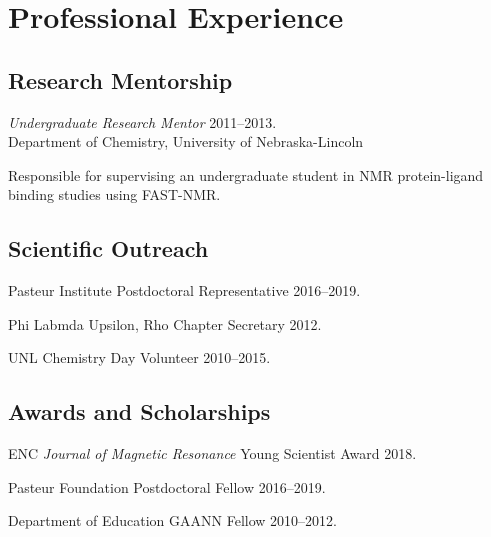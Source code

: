 \documentclass[letterpaper]{article}
\renewenvironment{itemize}{
  \begin{list}{}{
    \setlength{\leftmargin}{1.5em}
  }
}{
  \end{list}
}
\begin{document}
\section*{Professional Experience}

\subsection*{Research Mentorship}

\begin{itemize}
\item{
  {\it Undergraduate Research Mentor}
  \hfill 2011--2013. \\
  Department of Chemistry, University of Nebraska-Lincoln
  \begin{enumerate*}
    \item Responsible for supervising an undergraduate student in NMR
      protein-ligand binding studies using FAST-NMR.
  \end{enumerate*}
}
\end{itemize}

\subsection*{Scientific Outreach}

\begin{itemize}
 \item Pasteur Institute Postdoctoral Representative \hfill 2016--2019.
 \item Phi Labmda Upsilon, Rho Chapter Secretary \hfill 2012.
 \item UNL Chemistry Day Volunteer \hfill 2010--2015.
\end{itemize}

\subsection*{Awards and Scholarships}

\begin{itemize}
 \item ENC {\it Journal of Magnetic Resonance}
  Young Scientist Award \hfill 2018.
 \item Pasteur Foundation Postdoctoral Fellow \hfill 2016--2019.
 \item Department of Education GAANN Fellow \hfill 2010--2012.
\end{itemize}
\end{document}
